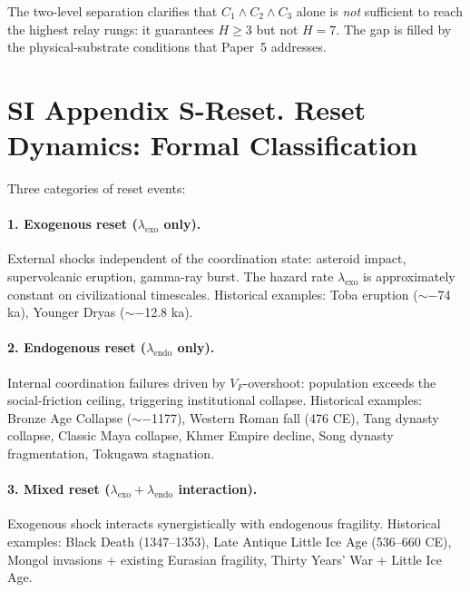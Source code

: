 \documentclass[11pt]{article}
\begin{document}
The two-level separation clarifies that $C_1 \wedge C_2 \wedge C_3$ alone is \emph{not} sufficient to reach the highest relay rungs: it guarantees $H \ge 3$ but not $H = 7$.
The gap is filled by the physical-substrate conditions that Paper~5 addresses.


\section*{SI Appendix S-Reset. Reset Dynamics: Formal Classification}

Three categories of reset events:

\paragraph{1. Exogenous reset ($\lambda_{\mathrm{exo}}$ only).}
External shocks independent of the coordination state: asteroid impact, supervolcanic eruption, gamma-ray burst.
The hazard rate $\lambda_{\mathrm{exo}}$ is approximately constant on civilizational timescales.
Historical examples: Toba eruption ($\sim -$74 ka), Younger Dryas ($\sim -$12.8 ka).

\paragraph{2. Endogenous reset ($\lambda_{\mathrm{endo}}$ only).}
Internal coordination failures driven by $V_F$-overshoot: population exceeds the social-friction ceiling, triggering institutional collapse.
Historical examples: Bronze Age Collapse ($\sim -$1177), Western Roman fall (476 CE), Tang dynasty collapse, Classic Maya collapse, Khmer Empire decline, Song dynasty fragmentation, Tokugawa stagnation.

\paragraph{3. Mixed reset ($\lambda_{\mathrm{exo}} + \lambda_{\mathrm{endo}}$ interaction).}
Exogenous shock interacts synergistically with endogenous fragility.
Historical examples: Black Death (1347--1353), Late Antique Little Ice Age (536--660 CE), Mongol invasions + existing Eurasian fragility, Thirty Years' War + Little Ice Age.
\end{document}
